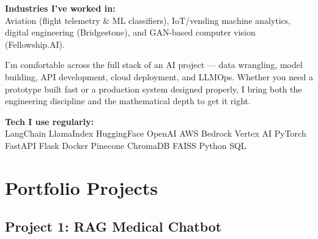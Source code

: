 \documentclass[11pt,a4paper]{article}
\begin{document}
\textbf{\textcolor{VividPurple}{Industries I've worked in:}}\\
Aviation (flight telemetry \& ML classifiers), IoT/vending machine analytics, digital engineering (Bridgestone), and GAN-based computer vision (Fellowship.AI).

I'm comfortable across the full stack of an AI project --- data wrangling, model building, API development, cloud deployment, and LLMOps. Whether you need a prototype built fast or a production system designed properly, I bring both the engineering discipline and the mathematical depth to get it right.

\textbf{\textcolor{VividPurple}{Tech I use regularly:}}\\
LangChain \textbullet{} LlamaIndex \textbullet{} HuggingFace \textbullet{} OpenAI \textbullet{} AWS Bedrock \textbullet{} Vertex AI \textbullet{} PyTorch \textbullet{} FastAPI \textbullet{} Flask \textbullet{} Docker \textbullet{} Pinecone \textbullet{} ChromaDB \textbullet{} FAISS \textbullet{} Python \textbullet{} SQL

\vspace{4pt}

\section{Portfolio Projects}

\subsection{Project 1: RAG Medical Chatbot}
\end{document}
